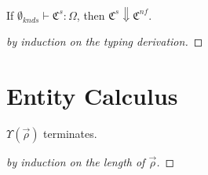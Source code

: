 \begin{lemma}[Progress]
If $\emptyset_{knds}\vdash\mathfrak{C}^s:\Omega$, then $\mathfrak{C}^s \Downarrow \mathfrak{C}^{nf}$. 
\end{lemma}
\begin{proof}[by induction on the typing derivation]
\end{proof}

\section{Entity Calculus}
\begin{lemma}\label{lem:entenvlookupterm}
$\Upsilon(\vec{\rho})$ terminates.
\end{lemma}
\begin{proof}[by induction on the length of $\vec{\rho}$]
\end{proof}

